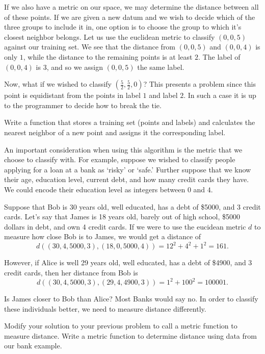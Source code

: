 If we also have a metric on our space, we may determine the distance between all of these points.  If we are given a new datum and we wish to decide which of the three groups to include it in, one option is to choose the group to which it's closest neighbor belongs.  Let us use the euclidean metric to classify $(0,0,5)$ against our training set.  We see that the distance from $(0,0,5)$ and $(0,0,4)$ is only $1$, while the distance to the remaining points is at least $2$.  The label of $(0,0,4)$ is $3$, and so we assign $(0,0,5)$ the same label.

Now, what if we wished to classify $(\frac{5}{2},\frac{5}{2},0)$?  This presents a problem since this point is equidistant from the points in label $1$ and label $2$.  In such a case it is up to the programmer to decide how to break the tie.

\begin{problem}

Write a function that stores a training set (points and labels) and calculates the nearest neighbor of a new point and assigns it the corresponding label.

\end{problem}

An important consideration when using this algorithm is the metric that we choose to classify with.  For example, suppose we wished to classify people applying for a loan at a bank as `risky' or `safe.'  Further suppose that we know their age, education level, current debt, and how many credit cards they have.  We could encode their education level as integers between $0$ and $4$.

Suppose that Bob is 30 years old, well educated, has a debt of \$5000, and 3 credit cards.  Let's say that James is 18 years old, barely out of high school, \$5000 dollars in debt, and own 4 credit cards.  If we were to use the eucidean metric $d$ to measure how close Bob is to James, we would get a distance of
\[
d((30,4,5000,3),(18,0,5000,4)) = 12^2 + 4^2 + 1^2 = 161.
\]

However, if Alice is well 29 years old, well educated, has a debt of \$4900, and 3 credit cards, then her distance from Bob is
\[
d((30,4,5000,3),(29,4,4900,3)) = 1^2 + 100^2 = 100001.
\]

Is James closer to Bob than Alice?  Most Banks would say no.  In order to classify these individuals better, we need to measure distance differently.

\begin{problem}

Modify your solution to your previous problem to call a metric function to measure distance.  Write a metric function to determine distance using data from our bank example.

\end{problem}


